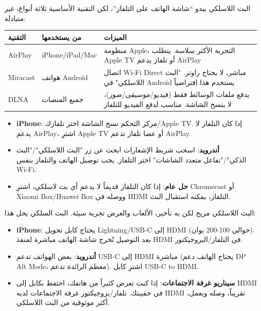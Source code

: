 


البث اللاسلكي يبدو “شاشة الهاتف على التلفاز”، لكن التقنية الأساسية ثلاثة أنواع، غير متبادلة:

\begin{center}
\begin{tabularx}{\linewidth}{|X|X|X|}
\hline
\textbf{التقنية} & \textbf{من يستخدمها} & \textbf{الميزات} \tabularnewline
\hline
AirPlay & iPhone/iPad/Mac & منظومة Apple، التجربة الأكثر سلاسة. يتطلب Apple TV أو تلفاز يدعم AirPlay \tabularnewline
Miracast & هواتف Android & اتصال Wi-Fi Direct مباشر، لا يحتاج راوتر. "البث اللاسلكي" في Android يستخدم هذا افتراضياً \tabularnewline
DLNA & جميع المنصات & يدفع ملفات الوسائط فقط (فيديو/موسيقى/صور)، لا ينسخ الشاشة. مناسب لدفع الفيديو للتلفاز \tabularnewline
\hline
\end{tabularx}
\end{center}


\begin{itemize}
  \item \textbf{iPhone}: مركز التحكم نسخ الشاشة اختر تلفازك/Apple TV. إذا كان التلفاز لا يدعم AirPlay، اشترِ Apple TV أو عصا تلفاز تدعم AirPlay.
  \item \textbf{أندرويد}: اسحب شريط الإشعارات ابحث عن زر "البث اللاسلكي"/"البث الذكي"/"تفاعل متعدد الشاشات" اختر التلفاز. يجب توصيل الهاتف والتلفاز بنفس Wi-Fi.
  \item \textbf{حل عام}: إذا كان التلفاز قديماً لا يدعم أي بث لاسلكي، اشترِ Chromecast أو Xiaomi Box/Huawei Box ووصله في HDMI التلفاز، يمكنه استقبال البث.
\end{itemize}


البث اللاسلكي مريح لكن به تأخير، الألعاب والعرض تجربة سيئة. البث السلكي يحل هذا:

\begin{itemize}
  \item \textbf{iPhone}: يحتاج كابل تحويل Lightning/USB-C إلى HDMI (حوالي 100-200 يوان). بعد التوصيل تُخرج شاشة الهاتف مباشرة لمنفذ HDMI في التلفاز/البروجيكتور.
  \item \textbf{أندرويد}: بعض الهواتف تدعم USB-C إلى HDMI مباشرة (يحتاج الهاتف دعم DP Alt Mode، معظم الرائدة تدعم). اشترِ كابل USB-C to HDMI.
  \item \textbf{سيناريو غرفة الاجتماعات}: إذا كنت تعرض كثيراً من هاتفك، احتفظ بكابل إلى HDMI في حقيبتك. تلفاز/بروجيكتور غرفة الاجتماعات لديه HDMI تقريباً، وصله ويعمل، أكثر موثوقية من البث اللاسلكي.
\end{itemize}


